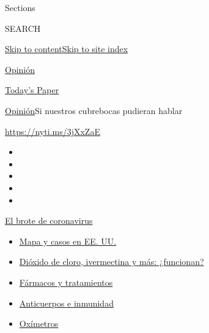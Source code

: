 Sections

SEARCH

\protect\hyperlink{site-content}{Skip to
content}\protect\hyperlink{site-index}{Skip to site index}

\href{https://www.nytimes3xbfgragh.onion/es/section/opinion}{Opinión}

\href{https://myaccount.nytimes3xbfgragh.onion/auth/login?response_type=cookie\&client_id=vi}{}

\href{https://www.nytimes3xbfgragh.onion/section/todayspaper}{Today's
Paper}

\href{/es/section/opinion}{Opinión}\textbar{}Si nuestros cubrebocas
pudieran hablar

\url{https://nyti.ms/3jXxZaE}

\begin{itemize}
\item
\item
\item
\item
\item
\end{itemize}

\href{https://www.nytimes3xbfgragh.onion/es/spotlight/coronavirus?action=click\&pgtype=Article\&state=default\&region=TOP_BANNER\&context=storylines_menu}{El
brote de coronavirus}

\begin{itemize}
\tightlist
\item
  \href{https://www.nytimes3xbfgragh.onion/es/interactive/2020/espanol/mundo/coronavirus-en-estados-unidos.html?action=click\&pgtype=Article\&state=default\&region=TOP_BANNER\&context=storylines_menu}{Mapa
  y casos en EE. UU.}
\item
  \href{https://www.nytimes3xbfgragh.onion/es/2020/07/23/espanol/america-latina/bolivia-cloro-coronavirus-ivermectina.html?action=click\&pgtype=Article\&state=default\&region=TOP_BANNER\&context=storylines_menu}{Dióxido
  de cloro, ivermectina y más: ¿funcionan?}
\item
  \href{https://www.nytimes3xbfgragh.onion/es/interactive/2020/science/coronavirus-tratamientos-curas.html?action=click\&pgtype=Article\&state=default\&region=TOP_BANNER\&context=storylines_menu}{Fármacos
  y tratamientos}
\item
  \href{https://www.nytimes3xbfgragh.onion/es/2020/07/28/espanol/ciencia-y-tecnologia/anticuerpos-coronavirus-inmunidad.html?action=click\&pgtype=Article\&state=default\&region=TOP_BANNER\&context=storylines_menu}{Anticuerpos
  e inmunidad}
\item
  \href{https://www.nytimes3xbfgragh.onion/es/2020/04/29/espanol/estilos-de-vida/oximetro-para-que-sirve.html?action=click\&pgtype=Article\&state=default\&region=TOP_BANNER\&context=storylines_menu}{Oxímetros}
\end{itemize}

